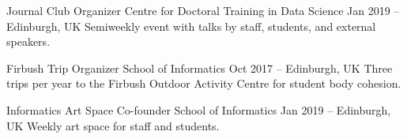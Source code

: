 \cvevent
{Journal Club Organizer}
{Centre for Doctoral Training in Data Science}
{Jan 2019 --}
{Edinburgh, UK}
Semiweekly event with talks by staff, students, and external speakers.

\divider

\cvevent
{Firbush Trip Organizer}
{School of Informatics}
{Oct 2017 --}
{Edinburgh, UK}
Three trips per year to the Firbush Outdoor Activity Centre for student body cohesion.

\divider

\cvevent
{Informatics Art Space Co-founder}
{School of Informatics}
{Jan 2019 --}
{Edinburgh, UK}
Weekly art space for staff and students.
